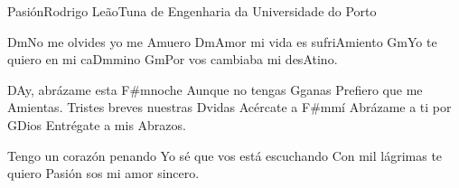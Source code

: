 \begin{musica}{Pasión}{Rodrigo Leão}{Tuna de Engenharia da Universidade do Porto}

\ac{Dm}{No} me olvides yo me \ac{A}{mue}ro
\ac{Dm}{Amor} mi vida es sufri\ac{A}{mien}to
\ac{Gm}{Yo} te quiero en mi ca\ac{Dm}{mi}no
\ac{Gm}{Por} vos cambiaba mi des\ac{A}{ti}no.

\ac{D}{Ay}, abrázame esta \ac{F#m}{no}che
Aunque no tengas \ac{G}{ga}nas
Prefiero que me \ac{A}{mien}tas.
Tristes breves nuestras \ac{D}{vi}das
Acércate a \ac{F#m}{mí}
Abrázame a ti por \ac{G}{Dios}
Entrégate a mis \ac{A}{bra}zos.

Tengo un corazón penando
Yo sé que vos está escuchando
Con mil lágrimas te quiero
Pasión sos mi amor sincero.


\end{musica}
